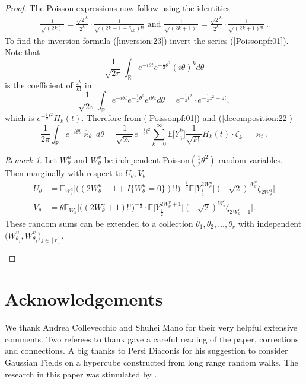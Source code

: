 \documentclass[preprint,11pt]{elsarticle}
\theoremstyle{remark}
\newtheorem{Remark}{Remark}
\begin{document}
{\begin{proof}
The Poisson expressions now follow using the identities
\begin{align*}
\frac{1}{\sqrt{(2k)!} }= \frac{ \sqrt{2}^k }{2^k}\cdot 
\frac{1}{ \sqrt{(2k-1+\delta_{k0})!!}  }\text{~and~}%
\frac{1}{\sqrt{(2k+1)!}} = \frac{\sqrt{2}^k}{2^k}\cdot \frac{1}{\sqrt{(2k+1)!!}}\ .
\end{align*}
%
To find the inversion formula (\ref{inversion:23}) invert the series (\ref{Poissonpf:01}).
Note that 
\[
\frac{1}{\sqrt{2\pi}}\int_{\mathbb{R}} e^{-i\theta t} e^{-\frac{1}{2}\theta^2}(i\theta)^k d\theta
\]
is the coefficient of $\frac{z^k}{k!}$ in 
\[
\frac{1}{\sqrt{2\pi}}\int_{\mathbb{R}} e^{-i\theta t}
 e^{-\frac{1}{2}\theta^2}e^{i\theta z}d\theta
 = e^{-\frac{1}{2}t^2}\cdot e^{-\frac{1}{2}z^2+zt},
\]
which is $e^{-\frac{1}{2}t^2}H_k(t).$ 
Therefore from (\ref{Poissonpf:01}) and (\ref{decomposition:22})
\[
\frac{1}{2\pi}\int_{\mathbb{R}} e^{-i\theta t}
\widehat{\varkappa}_\theta\ d\theta
= \frac{1}{\sqrt{2\pi}}e^{-\frac{1}{2}t^2}\sum_{k=0}^\infty 
\mathbb{E}\big [Y_{\frac{1}{2}}^k\big ]\frac{1}{\sqrt{k!}}H_k(t)\cdot\zeta_k = \varkappa_t.
\]
\begin{Remark}
Let $W_\theta^u$ and $W_\theta^v$ be independent Poisson$(\frac{1}{2}\theta^2)$ random variables. Then marginally with respect to $U_\theta, V_\theta$
\begin{align}
U_\theta &= 
\mathbb{E}_{W_\theta^u}\Big [
\Big ((2W_\theta^u-1+ I\big \{W_\theta^u=0\big \})!!\Big )^{-\frac{1}{2}}
\mathbb{E}\big [Y_{\frac{1}{2}}^{2W_\theta^u}\big ](-\sqrt{2})^{W_\theta^u } \zeta_{2W_\theta^u}\Big ]
\nonumber\\
V_\theta &= \theta
\mathbb{E}_{W_\theta^v}\Big [
\Big ((2W_\theta^v+1)!! \Big )^{-\frac{1}{2}}
\cdot \mathbb{E}\big [Y_{\frac{1}{2}}^{2W_\theta^v+1}\big ](-\sqrt{2})^{W_\theta^v} \zeta_{2W_\theta^v+1}\Big ].
\nonumber
\end{align}
These random sums can be extended to a collection $\theta_1,\theta_2,\ldots, \theta_r$ with independent $\big (W_{\theta_j}^u, W_{\theta_j}^v\big )_{j\in [r]}$.
\end{Remark}

\end{proof}
\section{Acknowledgements}
We thank Andrea Collevecchio  and Shuhei Mano for their very helpful extensive comments. 
Two referees to thank gave a careful reading of the paper, corrections and connections.
A big thanks to Persi Diaconis for his suggestion to consider Gaussian Fields on a hypercube constructed from long range random walks. The research in this paper was stimulated by \cite{D2020}.

}
\end{document}
